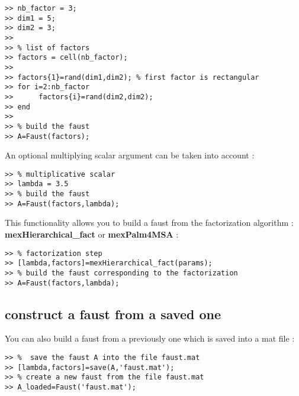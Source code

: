 \begin{lstlisting}
>> nb_factor = 3;
>> dim1 = 5;
>> dim2 = 3; 
>>
>> % list of factors
>> factors = cell(nb_factor);
>>
>> factors{1}=rand(dim1,dim2); % first factor is rectangular 
>> for i=2:nb_factor
>> 		factors{i}=rand(dim2,dim2);
>> end
>>
>> % build the faust
>> A=Faust(factors);
\end{lstlisting}
\newpage

An optional multiplying scalar argument can be taken into account  :
\begin{lstlisting}
>> % multiplicative scalar
>> lambda = 3.5 
>> % build the faust
>> A=Faust(factors,lambda);
\end{lstlisting}

This functionality allows you to build a faust from the factorization algorithm :
\textbf{mexHierarchical{\_}fact} or \textbf{mexPalm4MSA} :
\begin{lstlisting}
>> % factorization step
>> [lambda,factors]=mexHierarchical_fact(params);
>> % build the faust corresponding to the factorization
>> A=Faust(factors,lambda);
\end{lstlisting}

\subsection{construct a faust from a saved one}\label{sec:firstUseBuildFromSave}

You can also build a faust from a previously one which is saved into a mat file :
\begin{lstlisting}
>> %  save the faust A into the file faust.mat
>> [lambda,factors]=save(A,'faust.mat');
>> % create a new faust from the file faust.mat
>> A_loaded=Faust('faust.mat');
\end{lstlisting}
 